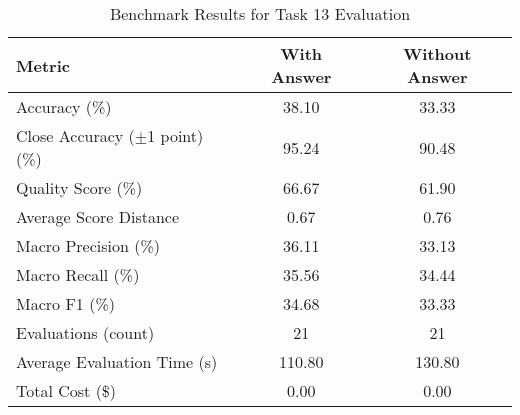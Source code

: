 \begin{table}[htbp]
\centering
\caption{Benchmark Results for Task 13 Evaluation}
\begin{tabular}{lcc}
\toprule
\textbf{Metric} & \textbf{With Answer} & \textbf{Without Answer} \\
\midrule
Accuracy (\%) & 38.10 & 33.33 \\
Close Accuracy ($\pm$1 point) (\%) & 95.24 & 90.48 \\
Quality Score (\%) & 66.67 & 61.90 \\
Average Score Distance & 0.67 & 0.76 \\
Macro Precision (\%) & 36.11 & 33.13 \\
Macro Recall (\%) & 35.56 & 34.44 \\
Macro F1 (\%) & 34.68 & 33.33 \\
Evaluations (count) & 21 & 21 \\
Average Evaluation Time (s) & 110.80 & 130.80 \\
Total Cost (\$) & 0.00 & 0.00 \\
\bottomrule
\end{tabular}
\end{table}